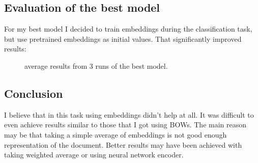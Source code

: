 \documentclass{article}
\begin{document}
\subsection{Evaluation of the best model}
For my best model I decided to train embeddings during the classification task,
but use pretrained embeddings as initial values. That significantly improved results:

\begin{figure}[h]
	\centering
	\begin{minipage}{0.45\textwidth}
	\scalebox{0.7}{}
	\end{minipage}
	\begin{minipage}{0.45\textwidth}
	\centering
	\scalebox{0.7}{}
	\end{minipage}
	\caption{average results from 3 runs of the best model.}
\end{figure}

\subsection{Conclusion}
I believe that in this task using embeddings didn't help at all. It was
difficult to even achieve results similar to those that I got using BOWs.
The main reason may be that taking a simple average of embeddings is not
good enough representation of the document. Better results may have been
achieved with taking weighted average or using neural network encoder.
\end{document}
